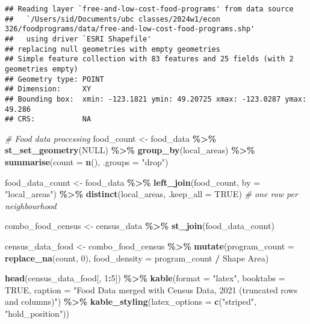 \documentclass[
]{article}
\newenvironment{Shaded}{\begin{snugshade}}{\end{snugshade}}
\newcommand{\AttributeTok}[1]{\textcolor[rgb]{0.13,0.29,0.53}{#1}}
\newcommand{\CommentTok}[1]{\textcolor[rgb]{0.56,0.35,0.01}{\textit{#1}}}
\newcommand{\ConstantTok}[1]{\textcolor[rgb]{0.56,0.35,0.01}{#1}}
\newcommand{\DecValTok}[1]{\textcolor[rgb]{0.00,0.00,0.81}{#1}}
\newcommand{\FunctionTok}[1]{\textcolor[rgb]{0.13,0.29,0.53}{\textbf{#1}}}
\newcommand{\NormalTok}[1]{#1}
\newcommand{\OtherTok}[1]{\textcolor[rgb]{0.56,0.35,0.01}{#1}}
\newcommand{\SpecialCharTok}[1]{\textcolor[rgb]{0.81,0.36,0.00}{\textbf{#1}}}
\newcommand{\StringTok}[1]{\textcolor[rgb]{0.31,0.60,0.02}{#1}}
\begin{document}
\begin{verbatim}
## Reading layer `free-and-low-cost-food-programs' from data source 
##   `/Users/sid/Documents/ubc classes/2024w1/econ 326/foodprograms/data/free-and-low-cost-food-programs.shp' 
##   using driver `ESRI Shapefile'
## replacing null geometries with empty geometries
## Simple feature collection with 83 features and 25 fields (with 2 geometries empty)
## Geometry type: POINT
## Dimension:     XY
## Bounding box:  xmin: -123.1821 ymin: 49.20725 xmax: -123.0287 ymax: 49.286
## CRS:           NA
\end{verbatim}

\begin{Shaded}
\begin{Highlighting}[]
\CommentTok{\# Food data processing}
\NormalTok{food\_count }\OtherTok{\textless{}{-}}\NormalTok{ food\_data }\SpecialCharTok{\%\textgreater{}\%}
  \FunctionTok{st\_set\_geometry}\NormalTok{(}\ConstantTok{NULL}\NormalTok{) }\SpecialCharTok{\%\textgreater{}\%} 
  \FunctionTok{group\_by}\NormalTok{(local\_areas) }\SpecialCharTok{\%\textgreater{}\%}
  \FunctionTok{summarise}\NormalTok{(}\AttributeTok{count =} \FunctionTok{n}\NormalTok{(), }\AttributeTok{.groups =} \StringTok{"drop"}\NormalTok{)}

\NormalTok{food\_data\_count }\OtherTok{\textless{}{-}}\NormalTok{ food\_data }\SpecialCharTok{\%\textgreater{}\%}
  \FunctionTok{left\_join}\NormalTok{(food\_count, }\AttributeTok{by =} \StringTok{"local\_areas"}\NormalTok{) }\SpecialCharTok{\%\textgreater{}\%}
  \FunctionTok{distinct}\NormalTok{(local\_areas, }\AttributeTok{.keep\_all =} \ConstantTok{TRUE}\NormalTok{) }\CommentTok{\# one row per neighbourhood}

\NormalTok{combo\_food\_census }\OtherTok{\textless{}{-}}\NormalTok{ census\_data }\SpecialCharTok{\%\textgreater{}\%}
  \FunctionTok{st\_join}\NormalTok{(food\_data\_count)}

\NormalTok{census\_data\_food }\OtherTok{\textless{}{-}}\NormalTok{ combo\_food\_census }\SpecialCharTok{\%\textgreater{}\%}
  \FunctionTok{mutate}\NormalTok{(}\AttributeTok{program\_count =} \FunctionTok{replace\_na}\NormalTok{(count, }\DecValTok{0}\NormalTok{),}
         \AttributeTok{food\_density =}\NormalTok{ program\_count }\SpecialCharTok{/} \StringTok{\textasciigrave{}}\AttributeTok{Shape Area}\StringTok{\textasciigrave{}}\NormalTok{)}

\FunctionTok{head}\NormalTok{(census\_data\_food[, }\DecValTok{1}\SpecialCharTok{:}\DecValTok{5}\NormalTok{]) }\SpecialCharTok{\%\textgreater{}\%}
  \FunctionTok{kable}\NormalTok{(}\AttributeTok{format =} \StringTok{"latex"}\NormalTok{, }\AttributeTok{booktabs =} \ConstantTok{TRUE}\NormalTok{, }\AttributeTok{caption =} \StringTok{"Food Data merged with Census Data, 2021 (truncated rows and columns)"}\NormalTok{) }\SpecialCharTok{\%\textgreater{}\%}
  \FunctionTok{kable\_styling}\NormalTok{(}\AttributeTok{latex\_options =} \FunctionTok{c}\NormalTok{(}\StringTok{"striped"}\NormalTok{, }\StringTok{"hold\_position"}\NormalTok{))}
\end{Highlighting}
\end{Shaded}
\end{document}
